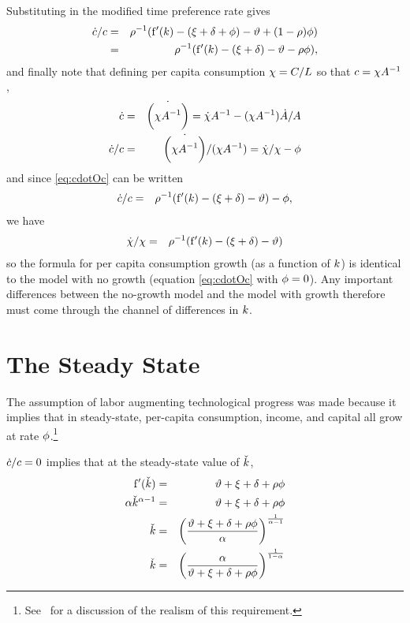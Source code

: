 \documentclass{handout}
\begin{document}
Substituting in the modified time preference rate gives
\begin{eqnarray}
  \dot{c}/c  & = & \rho^{-1}(\mathrm{f}^{\prime}({k})-(\xi+\delta+\phi)-\vartheta  +(1- \rho) \phi)
\\   & = & \rho^{-1}(\mathrm{f}^{\prime}({k})-(\xi+\delta)-\vartheta  - \rho \phi), \label{eq:cdotOc}
\end{eqnarray}
and finally note that defining per capita consumption $\chi = C/L$
so that $c = \chi A ^{-1}$, 
\begin{eqnarray}
  \label{eq:chiDotOchi}
 \dot{c} & = & \dot{\biggl(\chi A ^{-1}\biggr)} =  \dot{\chi}A ^{-1}-(\chi A ^{-1})\dot{A }/A 
 \\ \dot{c}/c & = & \dot{\biggl(\chi A ^{-1}\biggr)}/(\chi A^{-1}) =  \dot{\chi}/\chi - \phi 
\end{eqnarray}
and since \eqref{eq:cdotOc} can be written
\begin{eqnarray}
  \dot{c}/c  & = & \rho^{-1}(\mathrm{f}^{\prime}({k})-(\xi+\delta)-\vartheta ) - \phi,
\end{eqnarray}
we have
\begin{eqnarray}
 \dot{\chi}/\chi & = & \rho^{-1}(\mathrm{f}^{\prime}({k})-(\xi+\delta)-\vartheta )
\end{eqnarray}
so the formula for per capita consumption growth (as a function of
${k}$) is identical to the model with no growth (equation
\eqref{eq:cdotOc} with $\phi=0$).  Any important differences between
the no-growth model and the model with growth therefore must come
through the channel of differences in ${k}$.


\section{The Steady State}

The assumption of labor augmenting technological progress was made 
because it implies that in steady-state, per-capita consumption, income,
and capital all grow at rate $\phi$.\footnote{See~\cite{ghosDespiteUzawa} for a discussion of the realism of this requirement.}

$\dot{c}/c = 0$ implies that at the steady-state value of $\check{{k}}$,
\begin{eqnarray}
        \mathrm{f}^{\prime}(\check{{k}}) & = & \vartheta +\xi+\delta+\rho \phi  \\
        \alpha \check{{k}}^{\alpha-1} & = & \vartheta +\xi+\delta+\rho \phi  \\
        \check{{k}} & = & \left(\frac{\vartheta +\xi+\delta+\rho \phi}{\alpha}\right)^{\frac{1}{\alpha-1}}
\\      \check{{k}} & = & \left(\frac{\alpha}{\vartheta +\xi+\delta+\rho \phi}\right)^{\frac{1}{1-\alpha}}   
\end{eqnarray}
\end{document}
